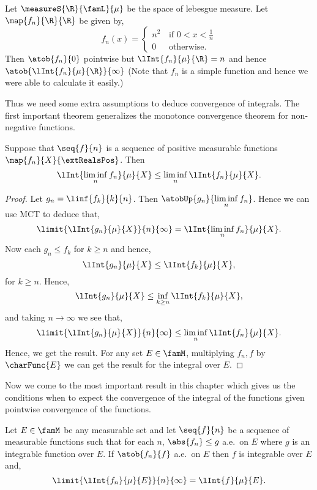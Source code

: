 \begin{Example}
    Let $\measureS{\R}{\famL}{\mu}$ be the space of lebesgue measure. 
    Let \\$\map{f_n}{\R}{\R}$ be given by,
    \begin{equation*}
	f_n(x) = 
	\begin{cases}
	    n^2 &\,\text{if $0 < x < \frac{1}{n}$} \\
	    0 &\, \text{otherwise.}
	\end{cases}
    \end{equation*}
    Then $\atob{f_n}{0}$ pointwise but $\lInt{f_n}{\mu}{\R} = n$ and hence
    $\atob{\lInt{f_n}{\mu}{\R}}{\infty}$ (Note that $f_n$ is a simple function and
    hence we were able to calculate it easily.)
\end{Example}
Thus we need some extra assumptions to deduce convergence of integrals. The first important theorem
generalizes the monotonce convergence theorem for non-negative functions.
\begin{Theorem}[name=Fatou's Lemma]\label{thm:Fatous_lemma}
    Suppose that $\seq{f}{n}$ is a sequence of positive measurable functions $\map{f_n}{X}{\extRealsPos}$.
    Then
    \begin{equation}
	\lInt{\liminf\limits_{n} f_n}{\mu}{X} \leq \liminf\limits_{n}\lInt{f_n}{\mu}{X}.
    \end{equation}
\end{Theorem}
\begin{proof}
    Let $g_n = \linf{f_k}{k}{n}$. Then $\atobUp{g_n}{\liminf\limits_n f_n}$.
    Hence we can use MCT to deduce that,
    \[\limit{\lInt{g_n}{\mu}{X}}{n}{\infty} = \lInt{\liminf\limits_n f_n}{\mu}{X}.\]
    Now each $g_n \leq f_k$ for $k \geq n$ and hence,
    \[\lInt{g_n}{\mu}{X} \leq \lInt{f_k}{\mu}{X},\]
    for $k \geq n$. Hence,
    \[\lInt{g_n}{\mu}{X} \leq \inf\limits_{k\geq n}\lInt{f_k}{\mu}{X},\]
    and taking $n\to \infty$ we see that,
    \[\limit{\lInt{g_n}{\mu}{X}}{n}{\infty} \leq \liminf\limits_{n}\lInt{f_n}{\mu}{X}.\]
    Hence, we get the result. For any set $E \in\famM$, multiplying $f_n,f$ by $\charFunc{E}$ we can get the
    result for the integral over $E$.
\end{proof}
Now we come to the most important result in this chapter which gives us the conditions when to expect the
convergence of the integral of the functions given pointwise convergence of the functions.
\begin{Theorem}[name=Dominated Convergence theorem]\label{thm:dominated_conv_thm}
    Let $E\in\famM$ be any measurable set and let $\seq{f}{n}$ be a sequence of measurable functions such that
    for each $n$, $\abs{f_n} \leq g$ a.e.~on $E$ where $g$ is an integrable function over $E$. If
    $\atob{f_n}{f}$ a.e.~on $E$ then $f$ is integrable over $E$ and,
    \[\limit{\lInt{f_n}{\mu}{E}}{n}{\infty} = \lInt{f}{\mu}{E}.\]
\end{Theorem}
